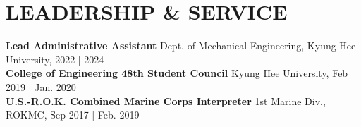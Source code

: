 \documentclass[a4paper,10pt]{extarticle}
\begin{document}


\section*{LEADERSHIP \& SERVICE}
\textbf{Lead Administrative Assistant} \hfill Dept. of Mechanical Engineering, Kyung Hee University, 2022 | 2024\\
\textbf{College of Engineering 48th Student Council} \hfill Kyung Hee University, Feb 2019 | Jan. 2020\\
\textbf{U.S.-R.O.K. Combined Marine Corps Interpreter} \hfill 1st Marine Div., ROKMC, Sep 2017 | Feb. 2019

\end{document}
